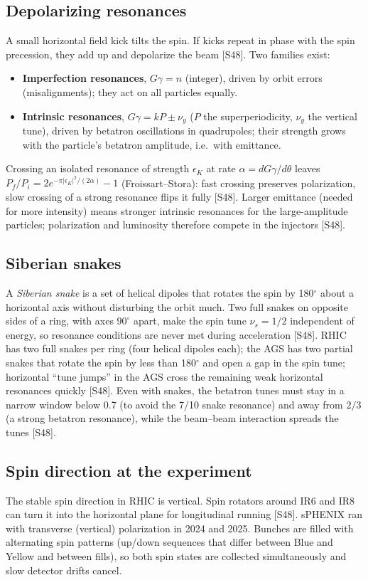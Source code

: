 \documentclass[11pt,letterpaper]{article}
\begin{document}
\subsection{Depolarizing resonances}
A small horizontal field kick tilts the spin. If kicks repeat in phase with the spin precession, they add up and depolarize
the beam [S48]. Two families exist:
\begin{itemize}
\item \textbf{Imperfection resonances}, $G\gamma=n$ (integer), driven by orbit errors (misalignments); they act on all particles equally.
\item \textbf{Intrinsic resonances}, $G\gamma=kP\pm\nu_y$ ($P$ the superperiodicity, $\nu_y$ the vertical tune), driven by betatron
oscillations in quadrupoles; their strength grows with the particle's betatron amplitude, i.e.\ with emittance.
\end{itemize}
Crossing an isolated resonance of strength $\epsilon_K$ at rate $\alpha=dG\gamma/d\theta$ leaves
$P_f/P_i=2e^{-\pi|\epsilon_K|^2/(2\alpha)}-1$ (Froissart--Stora): fast crossing preserves polarization, slow crossing of a
strong resonance flips it fully [S48]. Larger emittance (needed for more intensity) means stronger intrinsic resonances for the
large-amplitude particles; polarization and luminosity therefore compete in the injectors [S48].

\subsection{Siberian snakes}
A \emph{Siberian snake} is a set of helical dipoles that rotates the spin by 180$^\circ$ about a horizontal axis without
disturbing the orbit much. Two full snakes on opposite sides of a ring, with axes $90^\circ$ apart, make the spin tune
$\nu_s=1/2$ independent of energy, so resonance conditions are never met during acceleration [S48]. RHIC has two full snakes
per ring (four helical dipoles each); the AGS has two partial snakes that rotate the spin by less than 180$^\circ$ and open a
gap in the spin tune; horizontal ``tune jumps'' in the AGS cross the remaining weak horizontal resonances quickly [S48].
Even with snakes, the betatron tunes must stay in a narrow window below 0.7 (to avoid the 7/10 snake resonance) and away
from $2/3$ (a strong betatron resonance), while the beam--beam interaction spreads the tunes [S48].

\subsection{Spin direction at the experiment}
The stable spin direction in RHIC is vertical. Spin rotators around IR6 and IR8 can turn it into the horizontal plane for
longitudinal running [S48]. sPHENIX ran with transverse (vertical) polarization in 2024 and 2025. Bunches are filled with
alternating spin patterns (up/down sequences that differ between Blue and Yellow and between fills), so both spin states
are collected simultaneously and slow detector drifts cancel.
\end{document}
